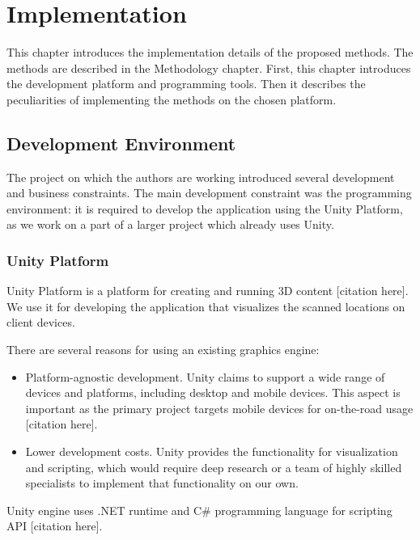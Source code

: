 \chapter{Implementation}
\label{chap:implementation}

\graphicspath{{figs/implementation/}}

This chapter introduces the implementation details of the proposed methods. The methods are described in the Methodology chapter. First, this chapter introduces the development platform and programming tools. Then it describes the peculiarities of implementing the methods on the chosen platform.

\section{Development Environment}

The project on which the authors are working introduced several development and business constraints. The main development constraint was the programming environment: it is required to develop the application using the Unity Platform, as we work on a part of a larger project which already uses Unity.

\subsection{Unity Platform}

Unity Platform is a platform for creating and running 3D content [citation here].  We use it for developing the application that visualizes the scanned locations on client devices.

There are several reasons for using an existing graphics engine:

\begin{itemize}
    \item Platform-agnostic development. Unity claims to support a wide range of devices and platforms, including desktop and mobile devices. This aspect is important as the primary project targets mobile devices for on-the-road usage [citation here].
    
    \item Lower development costs. Unity provides the functionality for visualization and scripting, which would require deep research or a team of highly skilled specialists to implement that functionality on our own.
\end{itemize}

Unity engine uses .NET runtime and C\# programming language for scripting API [citation here].

